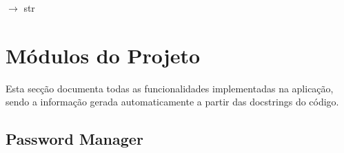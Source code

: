 \documentclass[letterpaper,10pt,english]{sphinxmanual}
\begin{document}

\begin{fulllineitems}
\label{\detokenize{main:main.read_choice}}
\pysigstartsignatures
\pysiglinewithargsret
{}
{\sphinxparamcomma {}}
{{ $\rightarrow$ str}}
\pysigstopsignatures
\end{fulllineitems}


\sphinxstepscope


\chapter{Módulos do Projeto}
\label{\detokenize{modules:modulos-do-projeto}}\label{\detokenize{modules::doc}}
\sphinxAtStartPar
Esta secção documenta todas as funcionalidades implementadas na aplicação,
sendo a informação gerada automaticamente a partir das docstrings do código.


\section{Password Manager}
\label{\detokenize{modules:module-modules.password_manager}}\label{\detokenize{modules:password-manager}}
\end{document}
